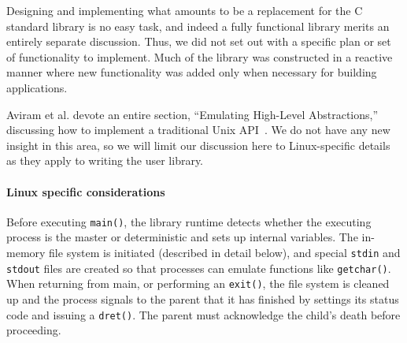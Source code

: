 Designing and implementing what amounts to be a replacement for the C standard
library is no easy task, and indeed a fully functional library merits an
entirely separate discussion. Thus, we did not set out with a specific plan or
set of functionality to implement. Much of the library was constructed in a
reactive manner where new functionality was added only when necessary for
building applications.

Aviram et al. devote an entire section, ``Emulating High-Level Abstractions,''
discussing how to implement a traditional Unix API~\cite{Aviram10}. We do not
have any new insight in this area, so we will
limit our discussion here to Linux-specific details as they apply to writing the
user library.

\paragraph{Linux specific considerations}
Before executing {\tt main()}, the library runtime detects whether the executing
process is the master or deterministic and sets up internal variables. The
in-memory file system is initiated (described in detail below), and special
{\tt stdin} and {\tt stdout} files are created so that processes can emulate
functions like {\tt getchar()}. When returning from main, or performing an
{\tt exit()}, the file system is cleaned up and the process signals to the
parent that it has finished by settings its status code and issuing a
{\tt dret()}. The parent must acknowledge the child's death before proceeding.

